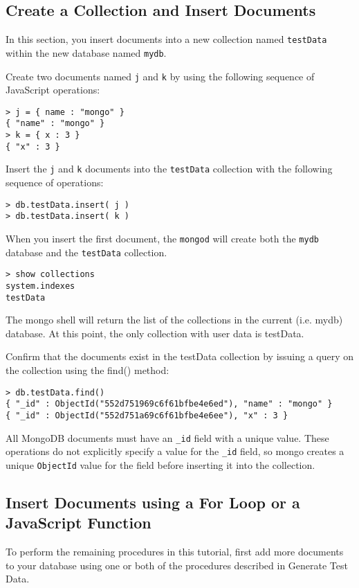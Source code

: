 \subsection{Create a Collection and Insert Documents}
In this section, you insert documents into a new collection named \verb|testData|
within the new database named \verb|mydb|.

Create two documents named \verb|j| and 
\verb|k| by using the following sequence of JavaScript operations:
\begin{verbatim}
> j = { name : "mongo" }
{ "name" : "mongo" }
> k = { x : 3 }
{ "x" : 3 }
\end{verbatim}
Insert the \verb|j| and \verb|k| documents into the 
\verb|testData| collection with the following sequence of operations:
\begin{verbatim}
> db.testData.insert( j )
> db.testData.insert( k )
\end{verbatim}
When you insert the first document, the \verb|mongod| 
will create both the \verb|mydb| 
database and the \verb|testData| collection.
\begin{verbatim}
> show collections
system.indexes
testData
\end{verbatim}
The mongo shell will return the list of the collections in the current (i.e. mydb) database. At this point, the only collection with user data is testData.

Confirm that the documents exist in the testData collection by issuing a query on the collection using the find() method:

\begin{verbatim}
> db.testData.find()
{ "_id" : ObjectId("552d751969c6f61bfbe4e6ed"), "name" : "mongo" }
{ "_id" : ObjectId("552d751a69c6f61bfbe4e6ee"), "x" : 3 }
\end{verbatim}
All MongoDB documents must have an \verb|_id| field with a unique value. These operations do not explicitly specify a value for the \verb|_id| field, so mongo creates a unique \verb|ObjectId| value for the field before inserting it into the collection.

\subsection{Insert Documents using a For Loop or a JavaScript Function}
To perform the remaining procedures in this tutorial, first add more documents to your database using one or both of the procedures described in Generate Test Data.


